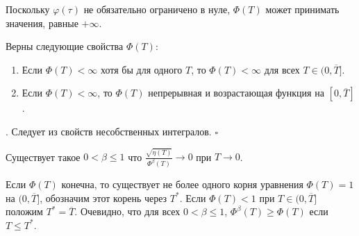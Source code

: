\documentclass[../main.tex]{subfiles}
\begin{document}
Поскольку $\varphi(\tau)$ не обязательно ограничено в нуле, $\Phi(T)$ может принимать значения, равные $+\infty$.
\begin{lemma}%
Верны следующие свойства $\Phi(T)$:
\begin{enumerate}
 \item Если $\Phi(T) < \infty $ хотя бы для одного $T$, то $\Phi(T) < \infty $ для всех $T \in (0, \overline{T}]$.
\item Если $\Phi(T) < \infty $, то $\Phi(T)$ непрерывная и возрастающая функция на $ [0,\overline{T}]$.
 \end{enumerate}
\end{lemma}
\doc. 
Следует из свойств несобственных интегралов. \hfill $ \square $
\begin{assumption}\label{s22:asm2}
Существует такое $ 0 < \beta \leqslant 1$ что $\frac{\sqrt{\eta(T)}}{\Phi^\beta(T)} \to 0$ при $T \to 0$.
\end{assumption}
Если $\Phi(T)$ конечна, то существует не более одного корня уравнения $\Phi(T)=1$ на $(0,\overline{T}]$, обозначим этот корень через $T^*$. 
Если $\Phi(T)<1$ при $T\in (0,\overline{T}]$ положим $T^*=\overline{T}$. 
Очевидно, что для всех $ 0 < \beta \leqslant 1$, $\Phi^\beta(T)\geqslant \Phi(T)$ если $T \leqslant T^*$.
\end{document}
